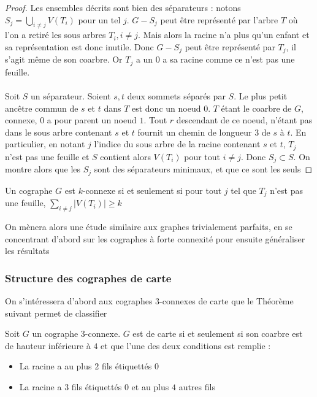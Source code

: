 \documentclass{scrartcl}
\begin{document}
\begin{flushleft}
\begin{proof}
    Les ensembles décrits sont bien des séparateurs : notons $\displaystyle S_j = \bigcup_{i \neq j} V(T_i)$ pour un tel $j$. $G - S_j$ peut être
    représenté par l'arbre $T$ où l'on a retiré les sous arbres $T_i, i \neq j$. Mais alors la racine n'a plus qu'un enfant et sa représentation est donc
    inutile. Donc $G - S_j$ peut être représenté par $T_j$, il s'agit même de son coarbre. Or $T_j$ a un $0$ a sa racine comme ce n'est pas une feuille.
    \\~\\
    Soit $S$ un séparateur. Soient $s, t$ deux sommets séparés par $S$. Le plus petit ancêtre commun de $s$ et $t$ dans $T$
    est donc un noeud $0$. $T$ étant le coarbre de $G$, connexe, $0$ a pour parent un noeud $1$. Tout $r$ descendant de ce noeud, n'étant pas dans le
    sous arbre contenant $s$ et $t$ fournit un chemin de longueur $3$ de $s$ à $t$. En particulier, en notant $j$ l'indice du sous arbre de la racine
    contenant $s$ et $t$, $T_j$ n'est pas une feuille et $S$ contient alors $V(T_i)$ pour tout $i \neq j$. Donc $S_j \subset S$. On montre
    alors que les $S_j$ sont des séparateurs minimaux, et que ce sont les seuls
\end{proof}

\begin{cor}\label{coarbrekconn}
    Un cographe $G$ est $k$-connexe si et seulement si pour tout $j$ tel que $T_j$ n'est pas une feuille, $\sum_{i \neq j} |V(T_i)| \geq k$
\end{cor}

On mènera alors une étude similaire aux graphes trivialement parfaits, en se concentrant d'abord sur les cographes à forte connexité pour ensuite
généraliser les résultats

\subsubsection{Structure des cographes de carte}

On s'intéressera d'abord aux cographes $3$-connexes de carte que le Théorème suivant permet de classifier

\begin{theorem}\label{cograph3conn}
    Soit $G$ un cographe $3$-connexe. $G$ est de carte si et seulement si son coarbre est de hauteur inférieure à $4$ et que l'une des deux
    conditions est remplie :
    \begin{itemize}
        \item La racine a au plus $2$ fils étiquettés $0$
        \item La racine a $3$ fils étiquettés $0$ et au plus $4$ autres fils 
    \end{itemize}
\end{theorem}


\end{flushleft}
\end{document}
